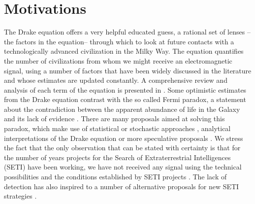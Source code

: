 \section{Motivations}\label{S_motivations}

The Drake equation \citep{drake_intelligent_1962} offers a very
helpful educated guess, a rational set of lenses --the factors in the
equation-- through which to look at future contacts with a
technologically advanced civilization in the Milky Way.
%
The equation quantifies the number of civilizations from whom we might
receive an electromagnetic signal, using a number of factors that have
been widely discussed in the literature and whose estimates are
updated constantly.
%
A comprehensive review and analysis of each term of the equation is
presented in \citet{vakoch_drake_2015}.
%
Some optimistic estimates from the Drake equation contrast with the so
called Fermi paradox, a statement about the contradiction between the
apparent abundance of life in the Galaxy and its lack of evidence
\citep[e.g. ][]{hart_explanation_1975, brin_great_1983,
barlow_galactic_2012, forgan_galactic_2016, vanhouten_isthere_2017,
Sotos_biotechnology_2019, carroll_nellemback_fermi_2019}.
%
There are many proposals aimed at solving this paradox, which make use
of statistical \citep{solomonides_probabilistic_2016,
vanhouten_isthere_2017, horvat_calculating_2007,
maccone_statistical_2015} or stochastic approaches
\citep{forgan_numerical_2009, bloetscher_using_2019,
glade_stochastic_2011, forgan_numerical_2010}, analytical
interpretations of the Drake equation \citep{prantzos_joint_2013,
smith_broadcasting_2009} or more speculative proposals
\citep{barlow_galactic_2013, lampton_information_2013,
conway_three_2018, forgan_galactic_2017}.
% 
We stress the fact that the only observation that can be stated with
certainty is that for the number of years projects for the Search of
Extraterrestrial Intelligences (SETI) have been working, we have not
received any signal using the technical possibilities and the
conditions established by SETI projects \citep{tarter_search_2001}.
%
The lack of detection has also inspired to a number of alternative
proposals for new SETI strategies \citep{forgan_exoplanet_2017,
balbi_impact_2018, loeb_eavesdropping_2006, maccone_KLT_2010,
tarter_advancing_2009, enriquez_breakthrough_2017, loeb_relative_2016,
maccone_SETI_2011,  lingam_relative_2019, wright_theGsearch_2015,
maccone_SETI_2013, maccone_lognormals_2014, harp_application_2018,
forgan_possibility_2013, forgan_galactic_2017, funes_searching_2019}.
 



